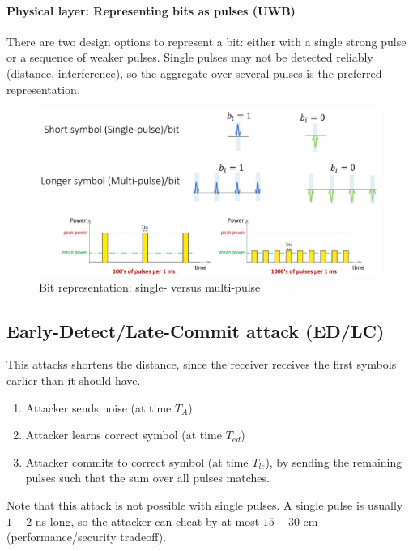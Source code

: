 \paragraph{Physical layer: Representing bits as pulses (UWB)}
There are two design options to represent a bit: either with a single strong pulse or a sequence of weaker pulses.
Single pulses may not be detected reliably (distance, interference), so the aggregate over several pulses is the preferred representation.

\begin{figure}[h]
	\centering
	\includegraphics[scale=0.3]{images/5-single-multi-pulse.png}
	\caption{Bit representation: single- versus multi-pulse}%
	\label{fig:single-multi-pulse}
\end{figure}

\subsection{Early-Detect/Late-Commit attack (ED/LC)}
This attacks shortens the distance, since the receiver receives the first symbols earlier than it should have.

\begin{enumerate}
	\item Attacker sends noise (at time $T_A$)
	\item Attacker learns correct symbol (at time $T_{ed}$)
	\item Attacker commits to correct symbol (at time $T_{lc}$), by sending the remaining pulses such that the sum over all pulses matches.
\end{enumerate}

Note that this attack is not possible with single pulses.
A single pulse is usually $1-2$ ns long, so the attacker can cheat by at most $15-30$ cm (performance/security tradeoff).


